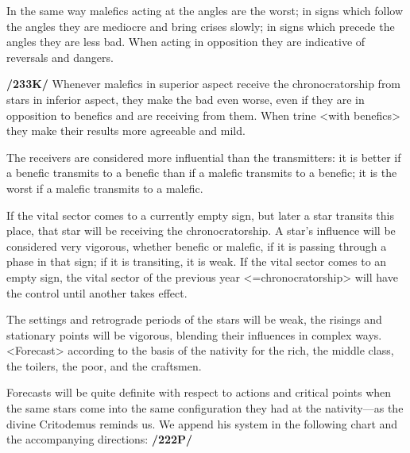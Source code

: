 In the same way malefics acting at the angles are the worst; in signs which follow the angles they are mediocre and bring crises slowly; in signs which precede the angles they are less bad. When acting in opposition they are indicative of reversals and dangers.

\textbf{/233K/} Whenever malefics in superior aspect receive the chronocratorship from stars in inferior aspect, they make the bad even worse, even if they are in opposition to benefics and are receiving from them. When trine <with benefics> they make their results more agreeable and mild. 

The \mndl receivers are considered more influential than the transmitters: it is better if a benefic transmits to a benefic than if a malefic transmits to a benefic; it is the worst if a malefic transmits to a malefic. 

If the vital sector comes to a currently empty sign, but later a star transits this place, that star will be receiving the chronocratorship. A
star’s influence will be considered very vigorous, whether benefic or malefic, if it is passing through a phase in that sign; if it is transiting, it is weak. If the vital sector comes to an empty sign, the vital sector of the previous year <=chronocratorship> will have the control until another takes effect.

The settings and retrograde periods of the stars will be weak, the risings and stationary points will be vigorous, blending their influences in complex ways. <Forecast> according to the basis of the nativity for the rich, the middle class, the toilers, the poor, and the craftsmen.

Forecasts will be quite definite with respect to actions and critical points when the same stars come into the same configuration they had at the nativity—as the divine Critodemus reminds us. We append his system in the following chart and the accompanying directions: \textbf{/222P/}


